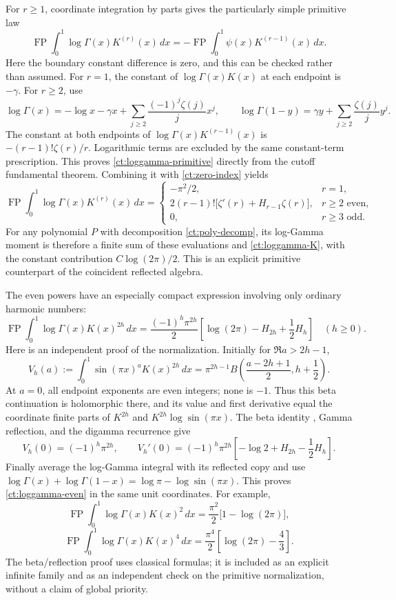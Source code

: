 \documentclass[11pt,a4paper]{article}
\numberwithin{equation}{section}
\theoremstyle{definition}
\theoremstyle{remark}
\begin{document}
For $r\ge1$, coordinate integration by parts gives the particularly
simple primitive law
\begin{equation}\label{ct:loggamma-primitive}
 \operatorname{FP}\int_0^1\log\Gamma(x)K^{(r)}(x)\,dx
       =-\operatorname{FP}\int_0^1\psi(x)K^{(r-1)}(x)\,dx.
\end{equation}
Here the boundary constant difference is zero, and this can be checked
rather than assumed. For $r=1$, the constant of $\log\Gamma(x)K(x)$
at each endpoint is $-\gamma$. For $r\ge2$, use
\[
 \log\Gamma(x)=-\log x-\gamma x+
     \sum_{j\ge2}\frac{(-1)^j\zeta(j)}j x^j,
 \qquad
 \log\Gamma(1-y)=\gamma y+
     \sum_{j\ge2}\frac{\zeta(j)}j y^j.
\]
The constant at both endpoints of
$\log\Gamma(x)K^{(r-1)}(x)$ is
$-(r-1)!\zeta(r)/r$. Logarithmic terms are excluded by the same
constant-term prescription. This proves \eqref{ct:loggamma-primitive}
directly from the cutoff fundamental theorem.
Combining it with \eqref{ct:zero-index} yields
\[
 \operatorname{FP}\int_0^1\log\Gamma(x)K^{(r)}(x)\,dx
 =\begin{cases}
 -\pi^2/2,&r=1,\\
 2(r-1)!\bigl[\zeta'(r)+H_{r-1}\zeta(r)\bigr],&r\ge2\text{ even},\\
 0,&r\ge3\text{ odd}.
 \end{cases}
\]
For any polynomial $P$ with decomposition \eqref{ct:poly-decomp}, its
log-Gamma moment is therefore a finite sum of these evaluations and
\eqref{ct:loggamma-K}, with the constant contribution
$C\log(2\pi)/2$. This is an explicit primitive counterpart of the
coincident reflected algebra.

The even powers have an especially compact expression involving only
ordinary harmonic numbers:
\begin{equation}\label{ct:loggamma-even}
 \boxed{\displaystyle
 \operatorname{FP}\int_0^1\log\Gamma(x)K(x)^{2h}\,dx
 =\frac{(-1)^h\pi^{2h}}2
       \left[\log(2\pi)-H_{2h}+\frac12H_h\right]
       \quad(h\ge0).}
\end{equation}
Here is an independent proof of the normalization. Initially for
$\Re a>2h-1$,
\[
 V_h(a):=\int_0^1\sin(\pi x)^aK(x)^{2h}\,dx
  =\pi^{2h-1}B\left(\frac{a-2h+1}{2},h+\frac12\right).
\]
At $a=0$, all endpoint exponents are even integers; none is $-1$.
Thus this beta continuation is holomorphic there, and its value and
first derivative equal the coordinate finite parts of $K^{2h}$ and
$K^{2h}\log\sin(\pi x)$. The beta identity \cite{DLMFBeta}, Gamma reflection, and the digamma recurrence \cite{DLMFGamma}
give
\[
 V_h(0)=(-1)^h\pi^{2h},\qquad
 V_h'(0)=(-1)^h\pi^{2h}
       \left[-\log2+H_{2h}-\frac12H_h\right].
\]
Finally average the log-Gamma integral with its reflected copy and use
$\log\Gamma(x)+\log\Gamma(1-x)=\log\pi-\log\sin(\pi x)$.
This proves \eqref{ct:loggamma-even} in the same unit coordinates.
For example,
\[
 \operatorname{FP}\int_0^1\log\Gamma(x)K(x)^2\,dx
   =\frac{\pi^2}{2}\bigl[1-\log(2\pi)\bigr],
\]
\[
 \operatorname{FP}\int_0^1\log\Gamma(x)K(x)^4\,dx
   =\frac{\pi^4}{2}\left[\log(2\pi)-\frac43\right].
\]
The beta/reflection proof uses classical formulas; it is included as an
explicit infinite family and as an independent check on the primitive
normalization, without a claim of global priority.
\end{document}
